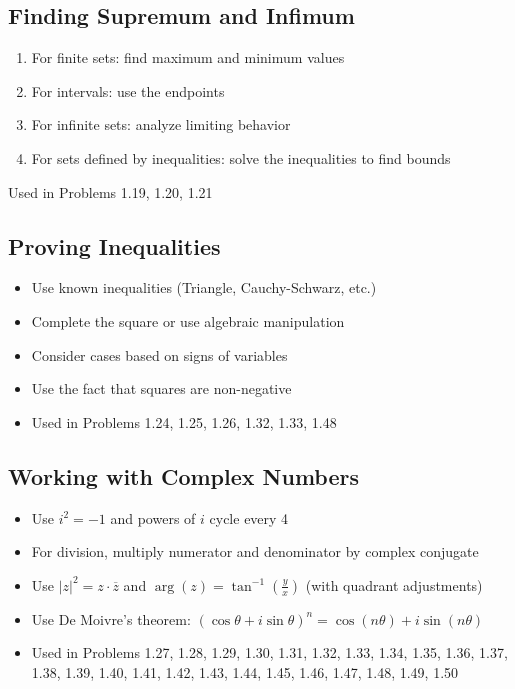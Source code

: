 \subsection*{Finding Supremum and Infimum}
\begin{enumerate}
\item For finite sets: find maximum and minimum values
\item For intervals: use the endpoints
\item For infinite sets: analyze limiting behavior
\item For sets defined by inequalities: solve the inequalities to find bounds
\end{enumerate}
Used in Problems 1.19, 1.20, 1.21

\subsection*{Proving Inequalities}
\begin{itemize}
\item Use known inequalities (Triangle, Cauchy-Schwarz, etc.)
\item Complete the square or use algebraic manipulation
\item Consider cases based on signs of variables
\item Use the fact that squares are non-negative
\item Used in Problems 1.24, 1.25, 1.26, 1.32, 1.33, 1.48
\end{itemize}

\subsection*{Working with Complex Numbers}
\begin{itemize}
\item Use $i^2 = -1$ and powers of $i$ cycle every 4
\item For division, multiply numerator and denominator by complex conjugate
\item Use $|z|^2 = z \cdot \overline{z}$ and $\arg(z) = \tan^{-1}(\frac{y}{x})$ (with quadrant adjustments)
\item Use De Moivre's theorem: $(\cos \theta + i \sin \theta)^n = \cos(n\theta) + i \sin(n\theta)$
\item Used in Problems 1.27, 1.28, 1.29, 1.30, 1.31, 1.32, 1.33, 1.34, 1.35, 1.36, 1.37, 1.38, 1.39, 1.40, 1.41, 1.42, 1.43, 1.44, 1.45, 1.46, 1.47, 1.48, 1.49, 1.50
\end{itemize}

